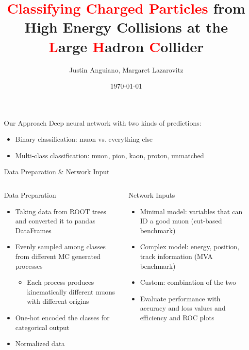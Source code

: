 \documentclass[10pt,handout]{beamer}
\author{Justin Anguiano, Margaret Lazarovitz}
\title{\textcolor{red}{Classifying Charged Particles} from High Energy Collisions at the \textcolor{red}{L}arge \textcolor{red}{H}adron \textcolor{red}{C}ollider }
\institute{University of Kansas}
\date{\today}
\begin{document}






\begin{frame}{Our Approach}
Deep neural network with two kinds of predictions:
\begin{itemize}
\item Binary classification: muon vs. everything else
\item Multi-class classification: muon, pion, kaon, proton, unmatched
\end{itemize}
\end{frame}

\begin{frame}{Data Preparation \& Network Input}
\begin{columns}
\begin{column}{0.5\textwidth}
Data Preparation
\begin{itemize}
\item Taking data from ROOT trees and converted it to pandas DataFrames
\item Evenly sampled among classes from different MC generated processes
\begin{itemize}
\item Each process produces kinematically different muons with different origins
\end{itemize}
\item One-hot encoded the classes for categorical output
\item Normalized data
\end{itemize}
\end{column}

\begin{column}{0.5\textwidth}
Network Inputs
\begin{itemize}
\item Minimal model: variables that can ID a good muon (cut-based benchmark)
\item Complex model: energy, position, track information (MVA benchmark)
\item Custom: combination of the two
\item Evaluate performance with accuracy and loss values and efficiency and ROC plots
\end{itemize}
\end{column}
\end{columns}
\end{frame}
\end{document}
